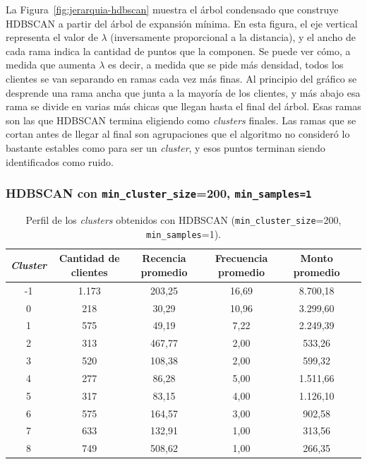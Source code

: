 \documentclass[a4paper,10pts,openany]{book}
\begin{document}
	La Figura~\ref{fig:jerarquia-hdbscan} muestra el árbol condensado que construye HDBSCAN a partir del árbol de expansión mínima. En esta figura, el eje vertical representa el valor de $\lambda$ (inversamente proporcional a la distancia), y el ancho de cada rama indica la cantidad de puntos que la componen. Se puede ver cómo, a medida que aumenta $\lambda$ es decir, a medida que se pide más densidad, todos los clientes se van separando en ramas cada vez más finas. Al principio del gráfico se desprende una rama ancha que junta a la mayoría de los clientes, y más abajo esa rama se divide en varias más chicas que llegan hasta el final del árbol. Esas ramas son las que HDBSCAN termina eligiendo como \emph{clusters} finales. Las ramas que se cortan antes de llegar al final son agrupaciones que el algoritmo no consideró lo bastante estables como para ser un \emph{cluster}, y esos puntos terminan siendo identificados como ruido.
	
	\subsubsection{HDBSCAN con \texttt{min\_cluster\_size}=200, \texttt{min\_samples=1}}
	
	\begin{table}[h]
		\centering
		\begin{tabular}{cccccc}
			\toprule
			\emph{Cluster} & Cantidad de clientes & Recencia promedio & Frecuencia promedio & Monto promedio \\
			\midrule
			-1 & 1.173 & 203{,}25 & 16{,}69 & 8.700{,}18 \\
			0  & 218  & 30{,}29  & 10{,}96 & 3.299{,}60 \\
			1  & 575  & 49{,}19  & 7{,}22  & 2.249{,}39 \\
			2  & 313  & 467{,}77 & 2{,}00  & 533{,}26 \\
			3  & 520  & 108{,}38 & 2{,}00  & 599{,}32 \\
			4  & 277  & 86{,}28  & 5{,}00  & 1.511{,}66 \\
			5  & 317  & 83{,}15  & 4{,}00  & 1.126{,}10 \\
			6  & 575  & 164{,}57 & 3{,}00  & 902{,}58 \\
			7  & 633  & 132{,}91 & 1{,}00  & 313{,}56 \\
			8  & 749  & 508{,}62 & 1{,}00  & 266{,}35 \\
			\bottomrule
		\end{tabular}
		\caption{Perfil de los \emph{clusters} obtenidos con HDBSCAN (\texttt{min\_cluster\_size}=200, \texttt{min\_samples}=1).}
		\label{tab:perfil-hdbscan2}
	\end{table}
	
\end{document}
